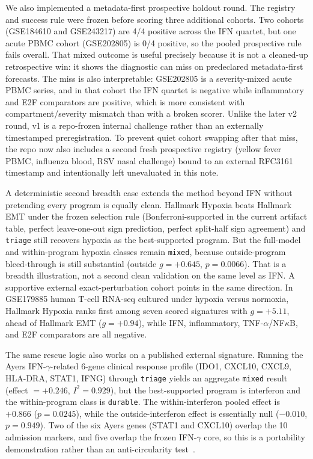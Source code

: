 \documentclass[10pt]{article}
\begin{document}
We also implemented a metadata-first prospective holdout round. The registry and success rule were frozen before scoring three additional cohorts. Two cohorts (GSE184610 and GSE243217) are 4/4 positive across the IFN quartet, but one acute PBMC cohort (GSE202805) is 0/4 positive, so the pooled prospective rule fails overall. That mixed outcome is useful precisely because it is not a cleaned-up retrospective win: it shows the diagnostic can miss on predeclared metadata-first forecasts. The miss is also interpretable: GSE202805 is a severity-mixed acute PBMC series, and in that cohort the IFN quartet is negative while inflammatory and E2F comparators are positive, which is more consistent with compartment/severity mismatch than with a broken scorer. Unlike the later v2 round, v1 is a repo-frozen internal challenge rather than an externally timestamped preregistration. To prevent quiet cohort swapping after that miss, the repo now also includes a second fresh prospective registry (yellow fever PBMC, influenza blood, RSV nasal challenge) bound to an external RFC3161 timestamp and intentionally left unevaluated in this note.

A deterministic second breadth case extends the method beyond IFN without pretending every program is equally clean. Hallmark Hypoxia beats Hallmark EMT under the frozen selection rule (Bonferroni-supported in the current artifact table, perfect leave-one-out sign prediction, perfect split-half sign agreement) and \texttt{triage} still recovers hypoxia as the best-supported program. But the full-model and within-program hypoxia classes remain \texttt{mixed}, because outside-program bleed-through is still substantial (outside $g=+0.645$, $p=0.0066$). That is a breadth illustration, not a second clean validation on the same level as IFN. A supportive external exact-perturbation cohort points in the same direction. In GSE179885 human T-cell RNA-seq cultured under hypoxia versus normoxia, Hallmark Hypoxia ranks first among seven scored signatures with $g=+5.11$, ahead of Hallmark EMT ($g=+0.94$), while IFN, inflammatory, TNF-$\alpha$/NF$\kappa$B, and E2F comparators are all negative.

The same rescue logic also works on a published external signature. Running the Ayers IFN-$\gamma$-related 6-gene clinical response profile (IDO1, CXCL10, CXCL9, HLA-DRA, STAT1, IFNG) through \texttt{triage} yields an aggregate \texttt{mixed} result (effect $=+0.246$, $I^2=0.929$), but the best-supported program is interferon and the within-program class is \texttt{durable}. The within-interferon pooled effect is $+0.866$ ($p=0.0245$), while the outside-interferon effect is essentially null ($-0.010$, $p=0.949$). Two of the six Ayers genes (STAT1 and CXCL10) overlap the 10 admission markers, and five overlap the frozen IFN-$\gamma$ core, so this is a portability demonstration rather than an anti-circularity test~\cite{ayers2017}.
\end{document}
